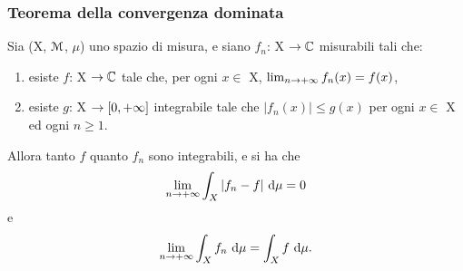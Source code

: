 \documentclass[Completo.tex]{subfiles}
\begin{document}
	\subsubsection{Teorema della convergenza dominata}
	\begin{eTh}
		Sia (X, $\eu[M]$, $\mu$) uno spazio di misura, e siano $f_n$: X $\ra \bb[C]$ misurabili tali che:
		\begin{enumerate}
			\item esiste $f$: X $\ra \bb[C]$ tale che, per ogni $x \in$ X, $\lim_{n \rightarrow +\infty} f_n(x) = f(x)$,
			\item esiste $g$: X $\rightarrow [0, +\infty]$ integrabile tale che $\vert f_n(x) \vert \leq g(x)$ per ogni $x \in$ X ed ogni $n\geq1$.
		\end{enumerate}
		Allora tanto $f$ quanto $f_n$ sono integrabili, e si ha che
		\begin{equation*}
		\lim_{n \rightarrow +\infty} \int_X \vert f_n - f \vert \ \mathrm{d}\mu = 0
		\end{equation*}
		e
		\begin{equation*}
		\lim_{n \rightarrow +\infty} \int_X f_n \ \mathrm{d}\mu = \int_X f \ \mathrm{d}\mu.
		\end{equation*}
	\end{eTh}
\end{document}
